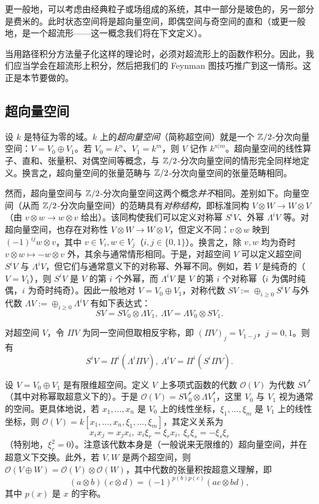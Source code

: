 更一般地，可以考虑由经典粒子或场组成的系统，其中一部分是玻色的，另一部分是费米的。此时状态空间将是超向量空间，即偶空间与奇空间的直和（或更一般地，是一个超流形——这一概念我们将在下文定义）。

当用路径积分方法量子化这样的理论时，必须对超流形上的函数作积分。因此，我们应当学会在超流形上积分，然后把我们的 Feynman 图技巧推广到这一情形。这正是本节要做的。

\subsection{超向量空间}

设 $k$ 是特征为零的域。$k$ 上的\emph{超向量空间}（简称超空间）就是一个 $\Bbb Z/2$-分次向量空间：$V=V_0\oplus V_1$。若 $V_0=k^n$、$V_1=k^m$，则 $V$ 记作 $k^{n|m}$。超向量空间的线性算子、直和、张量积、对偶空间等概念，与 $\Bbb Z/2$-分次向量空间的情形完全同样地定义。换言之，超向量空间的张量范畴与 $\Bbb Z/2$-分次向量空间的张量范畴相同。

然而，超向量空间与 $\Bbb Z/2$-分次向量空间这两个概念\emph{并不}相同。差别如下。向量空间（从而 $\Bbb Z/2$-分次向量空间）的范畴具有\emph{对称结构}，即标准同构 $V\otimes W\to W\otimes V$（由 $v\otimes w\to w\otimes v$ 给出）。该同构使我们可以定义对称幂 $S^iV$、外幂 $\Lambda^iV$ 等。对超向量空间，也存在对称性 $V\otimes W\to W\otimes V$，但定义不同：$v\otimes w$ 映到 $(-1)^{ij}w\otimes v$，其中 $v\in V_i, w\in V_j$（$i,j\in \lbrace{0,1\rbrace}$）。换言之，除 $v,w$ 均为奇时 $v\otimes w\mapsto -w\otimes v$ 外，其余与通常情形相同。于是，对超空间 $V$ 可以定义超空间 $S^iV$ 与 $\Lambda^iV$，但它们与通常意义下的对称幂、外幂不同。例如，若 $V$ 是纯奇的（$V=V_1$），则 $S^iV$ 是 $V$ 的第 $i$ 个外幂，而 $\Lambda^iV$ 是 $V$ 的第 $i$ 个对称幂（$i$ 为偶时纯偶，$i$ 为奇时纯奇）。因此一般地对 $V=V_0\oplus V_1$，对称代数 $SV:=\oplus_{i\ge 0}S^iV$ 与外代数 $\Lambda V:=\oplus_{i\ge 0}\Lambda^i V$ 有如下表达式：
$$
SV=SV_0\otimes \Lambda V_1,\ \Lambda V=\Lambda V_0\otimes SV_1.
$$

对超空间 $V$，令 $\Pi V$ 为同一空间但取相反宇称，即 $(\Pi V)_j=V_{1-j}$，$j=0,1$。则有
$$
S^iV=\Pi^i(\Lambda^i\Pi V),\ \Lambda^iV=\Pi^i(S^i\Pi V).
$$

设 $V=V_0\oplus V_1$ 是有限维超空间。定义 $V$ 上多项式函数的代数 ${\mathcal O}(V)$ 为代数 $SV^*$（其中对称幂取超意义下的）。于是 ${\mathcal O}(V)=SV_0^*\otimes \Lambda V_1^*$，这里 $V_0$ 与 $V_1$ 视为通常的空间。更具体地说，若 $x_1,...,x_n$ 是 $V_0$ 上的线性坐标，$\xi_1,...,\xi_m$ 是 $V_1$ 上的线性坐标，则 ${\mathcal O}(V)=k[x_1,...,x_n,\xi_1,...,\xi_m]$，其定义关系为
$$
x_ix_j=x_jx_i,\ x_i\xi_r=\xi_rx_i,\ \xi_r\xi_s=-\xi_s\xi_r
$$
（特别地，$\xi_r^2=0$）。注意该代数本身是（一般说来无限维的）超向量空间，并在超意义下交换。此外，若 $V,W$ 是两个超空间，则 ${\mathcal O}(V\oplus W)={\mathcal O}(V)\otimes {\mathcal O}(W)$，其中代数的张量积按超意义理解，即
$$
(a\otimes b)(c\otimes d)=
(-1)^{p(b)p(c)}(ac\otimes bd),
$$
其中 $p(x)$ 是 $x$ 的宇称。

